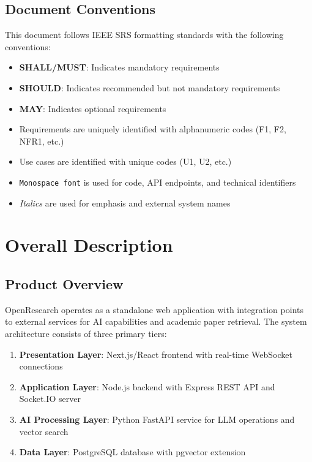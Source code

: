 \documentclass[11pt,a4paper]{article}
\begin{document}
\subsection{Document Conventions}

This document follows IEEE SRS formatting standards with the following conventions:

\begin{itemize}
    \item \textbf{SHALL/MUST}: Indicates mandatory requirements
    \item \textbf{SHOULD}: Indicates recommended but not mandatory requirements
    \item \textbf{MAY}: Indicates optional requirements
    \item Requirements are uniquely identified with alphanumeric codes (F1, F2, NFR1, etc.)
    \item Use cases are identified with unique codes (U1, U2, etc.)
    \item \texttt{Monospace font} is used for code, API endpoints, and technical identifiers
    \item \textit{Italics} are used for emphasis and external system names
\end{itemize}

\section{Overall Description}

\subsection{Product Overview}

OpenResearch operates as a standalone web application with integration points to external services for AI capabilities and academic paper retrieval. The system architecture consists of three primary tiers:

\begin{enumerate}
    \item \textbf{Presentation Layer}: Next.js/React frontend with real-time WebSocket connections
    \item \textbf{Application Layer}: Node.js backend with Express REST API and Socket.IO server
    \item \textbf{AI Processing Layer}: Python FastAPI service for LLM operations and vector search
    \item \textbf{Data Layer}: PostgreSQL database with pgvector extension
\end{enumerate}
\end{document}
